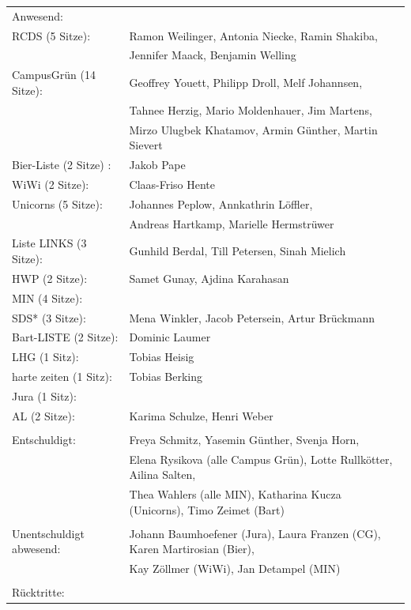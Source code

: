 \documentclass[ngerman,headheight=70pt]{scrartcl}
\begin{document}
    \begin{tabular}{ll}
        Anwesend: & \\
            RCDS (5 Sitze): & Ramon Weilinger, Antonia Niecke, Ramin Shakiba, \\
                            & Jennifer Maack, Benjamin Welling \\
             CampusGrün (14 Sitze): & Geoffrey Youett, Philipp Droll, Melf Johannsen, \\
                                   & Tahnee Herzig, Mario Moldenhauer, Jim Martens,\\
                                   & Mirzo Ulugbek Khatamov, Armin Günther, Martin Sievert\\
             Bier-Liste (2 Sitze) : & Jakob Pape \\
             WiWi (2 Sitze): & Claas-Friso Hente \\
             Unicorns (5 Sitze): & Johannes Peplow, Annkathrin Löffler, \\
                                 & Andreas Hartkamp, Marielle Hermstrüwer \\
             Liste LINKS (3 Sitze): & Gunhild Berdal, Till Petersen, Sinah Mielich \\
             HWP (2 Sitze): & Samet Gunay, Ajdina Karahasan \\
             MIN (4 Sitze): & \\
             SDS* (3 Sitze): & Mena Winkler, Jacob Petersein, Artur Brückmann \\
             Bart-LISTE (2 Sitze): & Dominic Laumer \\
             LHG (1 Sitz): & Tobias Heisig \\
             harte zeiten (1 Sitz): & Tobias Berking \\
             Jura (1 Sitz): & \\
             AL (2 Sitze): & Karima Schulze, Henri Weber \\
            & \\
        Entschuldigt: & Freya Schmitz, Yasemin Günther, Svenja Horn,\\
                      & Elena Rysikova (alle Campus Grün), Lotte Rullkötter, Ailina Salten,\\
                      & Thea Wahlers (alle MIN), Katharina Kucza (Unicorns), Timo Zeimet (Bart) \\
                                &\\
        Unentschuldigt abwesend: & Johann Baumhoefener (Jura), Laura Franzen (CG), Karen Martirosian (Bier), \\
                                & Kay Zöllmer (WiWi), Jan Detampel (MIN) \\
                                &\\
        Rücktritte: & \\
    \end{tabular}
\end{document}

